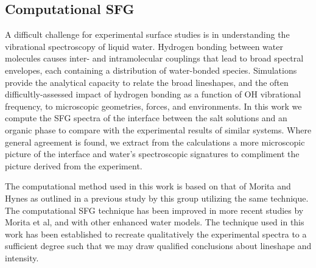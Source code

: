 


\subsection{Computational SFG}
A difficult challenge for experimental surface studies is in understanding the vibrational spectroscopy of liquid water. Hydrogen bonding between water molecules causes inter- and intramolecular couplings that lead to broad spectral envelopes, each containing a distribution of water-bonded species. Simulations provide the analytical capacity to relate the broad lineshapes, and the often difficultly-assessed impact of hydrogen bonding as a function of OH vibrational frequency, to microscopic geometries, forces, and environments. In this work we compute the SFG spectra of the interface between the salt solutions and an organic phase to compare with the experimental results of similar systems.\cite{McFearin2009} Where general agreement is found, we extract from the calculations a more microscopic picture of the interface and water's spectroscopic signatures to compliment the picture derived from the experiment.

The computational method used in this work is based on that of Morita and Hynes\cite{Morita2000} as outlined in a previous study by this group utilizing the same technique.\cite{Walker2008} The computational SFG technique has been improved in more recent studies by Morita et al,\cite{Morita2002,Ishiyama2009} and with other enhanced water models. The technique used in this work has been established to recreate qualitatively the experimental spectra to a sufficient degree such that we may draw qualified conclusions about lineshape and intensity. 


